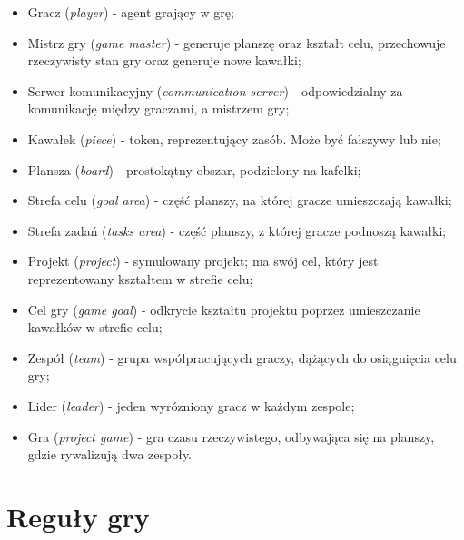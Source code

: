 \documentclass[a4paper]{article}
\begin{document}
\begin{itemize}
\item
  Gracz (\emph{player}) - agent grający w grę;
\item
  Mistrz gry (\emph{game master}) - generuje planszę oraz kształt celu, przechowuje rzeczywisty stan gry oraz generuje nowe kawałki;
\item
  Serwer komunikacyjny (\emph{communication server}) - odpowiedzialny za komunikację między graczami, a mistrzem gry;
\item
  Kawałek (\emph{piece}) - token, reprezentujący zasób. Może być fałszywy lub nie;
\item
  Plansza (\emph{board}) - prostokątny obszar, podzielony na kafelki;
\item
  Strefa celu (\emph{goal area}) - część planszy, na której gracze umieszczają kawałki;
\item
  Strefa zadań (\emph{tasks area}) - część planszy, z której gracze podnoszą kawałki;
\item
  Projekt (\emph{project}) - symulowany projekt; ma swój cel, który jest reprezentowany kształtem w strefie celu;
\item
  Cel gry (\emph{game goal}) - odkrycie kształtu projektu poprzez umieszczanie kawałków w strefie celu;
\item
  Zespół (\emph{team}) - grupa współpracujących graczy, dążących do osiągnięcia celu gry;
\item
  Lider (\emph{leader}) - jeden wyrózniony gracz w każdym zespole;
\item
  Gra (\emph{project game}) - gra czasu rzeczywistego, odbywająca się na planszy, gdzie rywalizują dwa zespoły.
\end{itemize}

\section{Reguły gry}
\end{document}
